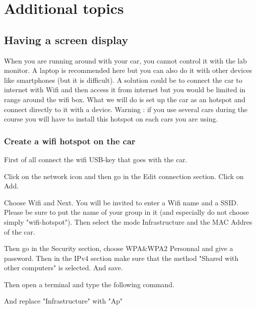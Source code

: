 %
%


\chapter{Additional topics}
\label{sec:advanced}

\section{Having a screen display}
\label{sec: advanced_screen}
When you are running around with your car, you cannot control it with the lab monitor. A laptop is recommended here  but you can also do it with other devices like smartphones (but it is difficult). A solution could be to connect the car to internet with Wifi and then access it from internet but you would be limited in range around the wifi box. What we will do is set up the car as an hotspot and connect directly to it with a device. Warning : if you use several cars during the course you will have to install this hotspot on each cars you are using.

\subsection{Create a wifi hotspot on the car}

First of all connect the wifi USB-key that goes with the car.

Click on the network icon and then go in the Edit connection section. Click on Add.

Choose Wifi and Next. You will be invited to enter a Wifi name and a SSID. Please be sure to put the name of your group in it (and especially do not choose simply "wifi-hotspot"). Then select the mode Infrastructure and the MAC Addres of the car.

Then go in the Security section, choose WPA\&WPA2 Personnal and give a password. Then in the IPv4 section make sure that the method "Shared with other computers" is selected. And save.

Then open a terminal and type the following command.


And replace "Infrastructure" with "Ap"


